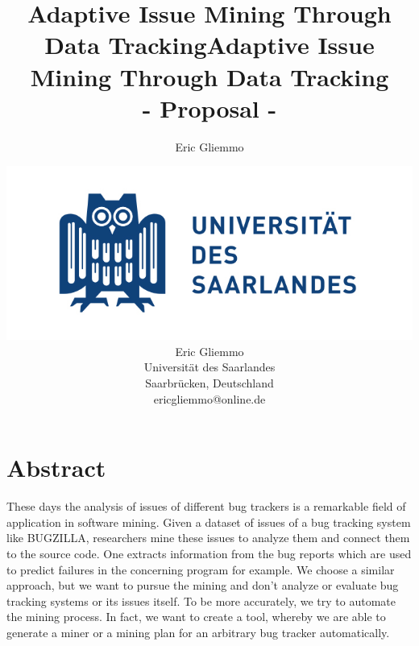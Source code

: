 \documentclass[12pt,a4paper,final]{article}
\author{Eric Gliemmo}
\title{Adaptive Issue Mining Through Data Tracking}
\begin{document}
\title{Adaptive Issue Mining Through Data Tracking\\ - Proposal - }
\author{\includegraphics[scale=0.3]{Unilogo.png} \\ Eric Gliemmo\\
Universität des Saarlandes \\
Saarbr\"ucken, Deutschland\\
ericgliemmo@online.de
}
\maketitle

\section{Abstract}
These days the analysis of issues of different bug trackers is a remarkable field of application in software mining. Given a dataset of issues of a bug tracking system like BUGZILLA, researchers mine these issues to analyze them and connect them to the source code. One extracts information from the bug reports which are used to predict failures in the concerning program for example. We choose a similar approach, but we want to pursue the mining and don't analyze or evaluate bug tracking systems or its issues itself. To be more accurately, we try to automate the mining process. In fact, we want to create a tool, whereby we are able to generate a miner or a mining plan for an arbitrary bug tracker automatically. \pagebreak 
\end{document}
